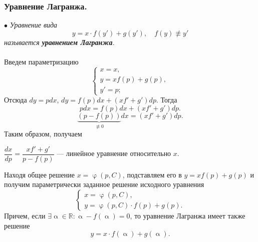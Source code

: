 \documentclass[a4paper, 12pt]{report}
\newcommand{\Rm}{\mathbb{R}}
\renewcommand{\alpha}{\upalpha}
\renewcommand{\varphi}{\upvarphi}
\begin{document}
\subsubsection{Уравнение Лагранжа.}
$\bullet$ \textit{Уравнение вида $$y = x\cdot f(y') + g(y'),\quad f(y) \not\equiv y'$$ называется \textbf{уравнением Лагранжа}.}\\\\
Введем параметризацию $$\begin{cases}
	x = x,\\
	y = xf(p) + g(p),\\
	y' = p;
\end{cases}$$
Отсюда $dy = pdx$, $dy = f(p)dx + (xf' + g')dp.$ Тогда $$pdx = f(p)dx + (xf' + g')dp.$$
$$\underbrace{(p-f(p))}_{\not\equiv 0}dx = (xf' + g')dp.$$
Таким образом, получаем \begin{center}
	$\dfrac{dx}{dp} = \dfrac{xf' + g'}{p - f(p)}$ --- линейное уравнение относительно $x$.
\end{center}
Находя общее решение $x = \varphi(p,C)$, подставляем его в $y = xf(p) + g(p)$ и получим параметрически заданное решение исходного уравнения $$\begin{cases}
	x = \varphi(p,C),\\
	y = \varphi(p,C)\cdot f(p) + g(p).
\end{cases}$$
Причем, если $\exists \alpha \in \Rm : \alpha - f(\alpha ) = 0$, то уравнение Лагранжа имеет также решение $$y = x\cdot f(\alpha) + g(\alpha).$$
\end{document}

